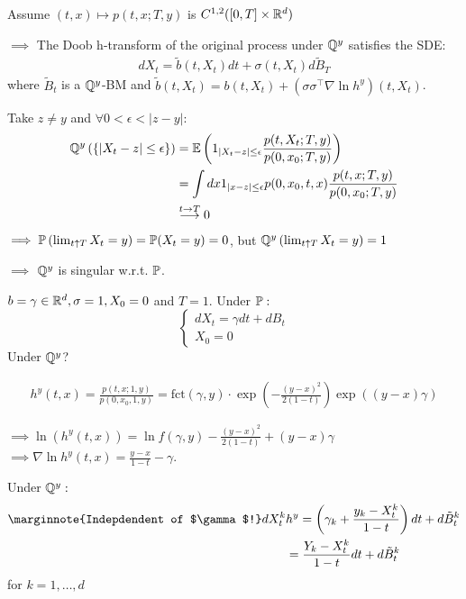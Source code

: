 \begin{corollary}\label{cor:2.6}
    Assume $(t,x)\mapsto p(t,x;T,y)$ is $C^{1,2}([0,T]\times \mathbb{R}^d)$
    
    $\implies$ The Doob h-transform of the original process under $\mathbb{Q}^y$ satisfies the SDE:
    \begin{align*}
            dX_t=\tilde{b}(t,X_t)dt+\sigma(t,X_t)d\tilde{B}_T
    \end{align*}
    where $\tilde{B}_t$ is a $\mathbb{Q}^y$-BM and $\tilde{b}(t,X_t)=b(t,X_t)+(\sigma\sigma^\intercal \nabla \ln h^y)(t,X_t)$.
\end{corollary}

\begin{remark}
    Take $z\neq y$ and $\forall 0<\epsilon<|z-y|$:
    \begin{align*}
        \mathbb{Q}^y\left(\{|X_t-z|\leq \epsilon\}\right)&=\mathbb{E}\left(1_{|X_t-z|\leq \epsilon}\frac{p(t,X_t;T,y)}{p(0,x_0;T,y)}\right)\\
        &=\int dx 1_{|x-z|\leq \epsilon}p(0,x_0,t,x)\frac{p(t,x;T,y)}{p(0,x_0;T,y)}\\
        &\stackrel{t\to T}{\longrightarrow}0
    \end{align*}
    $\implies \mathbb{P}\left(\lim_{t\uparrow T}X_t=y\right)=\mathbb{P}(X_t=y)=0$, but $\mathbb{Q}^y\left(\lim_{t\uparrow T} X_t=y\right)=1$

    $\implies$ $\mathbb{Q}^y$ is singular w.r.t. $\mathbb{P}$.
\end{remark}

\begin{aexample}
    $b=\gamma\in\mathbb{R}^d,\sigma=1,X_0=0$ and $T=1$. Under $\mathbb{P}:$
    \[\begin{cases}
        dX_t=\gamma dt + dB_t\\
        X_0=0
    \end{cases}\]
    Under $\mathbb{Q}^y$?

    \begin{align*}
        h^y(t,x)=\frac{p(t,x;1,y)}{p(0,x_0,1,y)}=\text{fct}(\gamma,y)\cdot \exp\left(-\frac{(y-x)^2}{2(1-t)}\right)\exp\left((y-x)\gamma\right)
    \end{align*}

    $\implies \ln( h^y(t,x))=\ln f(\gamma,y)-\frac{(y-x)^2}{2(1-t)}+(y-x)\gamma$
    $\implies \nabla \ln h^y(t,x)=\frac{y-x}{1-t}-\gamma$.

    Under $\mathbb{Q}^y:$
    \begin{align*}\marginnote{Indepdendent of $\gamma$!}
        dX_t^k&h^y=\left(\gamma_k+\frac{y_k-X_t^k}{1-t}\right)dt + d\tilde{B}_t^k\\
        &=\frac{Y_k-X_t^k}{1-t}dt +d\tilde{B}_t^k
    \end{align*}
    for $k=1,\dots,d$
\end{aexample}


